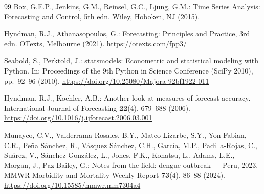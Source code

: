 \documentclass[runningheads]{llncs}
\begin{document}
\begin{thebibliography}{99}
Box, G.E.P., Jenkins, G.M., Reinsel, G.C., Ljung, G.M.:
Time Series Analysis: Forecasting and Control, 5th edn. Wiley, Hoboken, NJ (2015).

Hyndman, R.J., Athanasopoulos, G.:
Forecasting: Principles and Practice, 3rd edn. OTexts, Melbourne (2021).
\url{https://otexts.com/fpp3/}

Seabold, S., Perktold, J.:
statsmodels: Econometric and statistical modeling with Python. In: Proceedings of the
9th Python in Science Conference (SciPy 2010), pp.~92--96 (2010).
\url{https://doi.org/10.25080/Majora-92bf1922-011}

Hyndman, R.J., Koehler, A.B.:
Another look at measures of forecast accuracy. International Journal of Forecasting
\textbf{22}(4), 679--688 (2006). \url{https://doi.org/10.1016/j.ijforecast.2006.03.001}

Munayco, C.V., Valderrama Rosales, B.Y., Mateo Lizarbe, S.Y., Yon Fabian, C.R., Pe\~na
S\'anchez, R., V\'asquez S\'anchez, C.H., Garc\'ia, M.P., Padilla-Rojas, C., Su\'arez, V.,
S\'anchez-Gonz\'alez, L., Jones, F.K., Kohatsu, L., Adams, L.E., Morgan, J., Paz-Bailey, G.:
Notes from the field: dengue outbreak --- Peru, 2023. MMWR Morbidity and Mortality Weekly
Report \textbf{73}(4), 86--88 (2024). \url{https://doi.org/10.15585/mmwr.mm7304a4}
\end{thebibliography}
\end{document}
